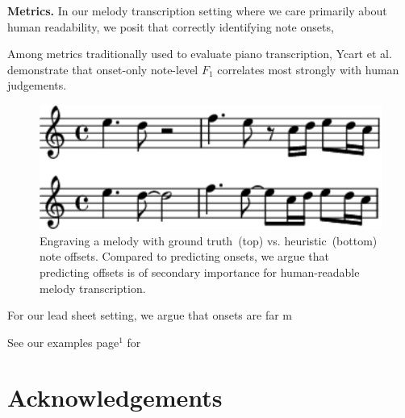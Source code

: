 \documentclass{article}
\begin{document}
\textbf{Metrics.} In our melody transcription setting where we care primarily about human readability, 
we posit that correctly identifying note onsets, 

Among metrics traditionally used to evaluate piano transcription, Ycart et al.~\cite{ycart2020investigating} demonstrate that onset-only note-level $F_1$ correlates most strongly with human judgements. 

\begin{figure}[t]
    \centering
    \includegraphics[width=0.95\linewidth]{figs/heuristic_offsets.pdf}
    \caption{Engraving a melody with ground truth~(top) vs. heuristic~(bottom) note offsets. Compared to predicting onsets, we argue that predicting offsets is of secondary importance for human-readable melody transcription.}
    \label{fig:heuristic_offsets}
\end{figure}

For our lead sheet setting, 
we argue that onsets are far m

See our examples page$^1$ for 






\section{Acknowledgements}



\end{document}
